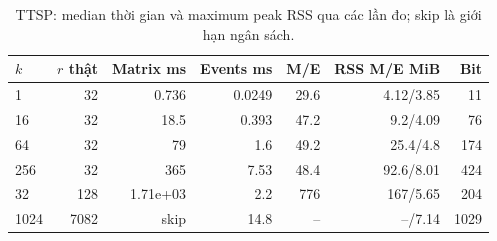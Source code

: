 \begin{table}[htbp]
\centering
\small
\setlength{\tabcolsep}{4pt}
\caption{TTSP: median thời gian và maximum peak RSS qua các lần đo; skip là giới hạn ngân sách.}
\label{tab:ttsp-repeated}
\begin{tabular}{lrrrrrr}
\toprule
$k$ & $r$ thật & Matrix ms & Events ms & M/E & RSS M/E MiB & Bit \\
\midrule
1 & 32 & 0.736 & 0.0249 & 29.6 & 4.12/3.85 & 11 \\
16 & 32 & 18.5 & 0.393 & 47.2 & 9.2/4.09 & 76 \\
64 & 32 & 79 & 1.6 & 49.2 & 25.4/4.8 & 174 \\
256 & 32 & 365 & 7.53 & 48.4 & 92.6/8.01 & 424 \\
32 & 128 & 1.71e+03 & 2.2 & 776 & 167/5.65 & 204 \\
1024 & 7082 & skip & 14.8 & -- & --/7.14 & 1029 \\
\bottomrule
\end{tabular}
\end{table}

